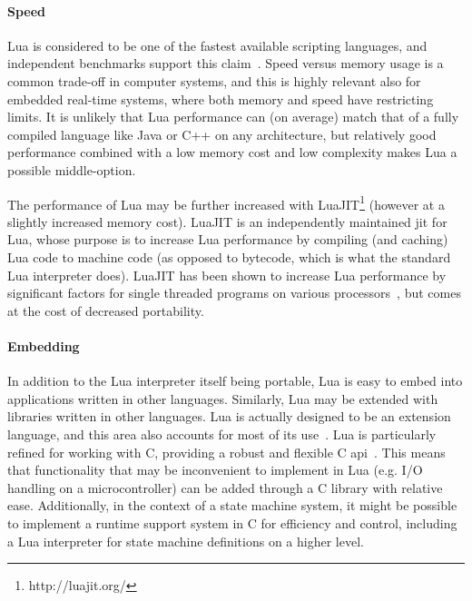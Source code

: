 \paragraph{Speed}
Lua is considered to be one of the fastest available scripting languages, and independent benchmarks support this claim~\cite{website:computer_language_benchmarks_game}. Speed versus memory usage is a common trade-off in computer systems, and this is highly relevant also for embedded real-time systems, where both memory and speed have restricting limits. It is unlikely that Lua performance can (on average) match that of a fully compiled language like Java or C++ on any architecture, but relatively good performance combined with a low memory cost and low complexity makes Lua a possible middle-option.

The performance of Lua may be further increased with LuaJIT\footnote{http://luajit.org/} (however at a slightly increased memory cost). LuaJIT is an independently maintained \gls{jit} for Lua, whose purpose is to increase Lua performance by compiling (and caching) Lua code to machine code (as opposed to bytecode, which is what the standard Lua interpreter does). LuaJIT has been shown to increase Lua performance by significant factors for single threaded programs on various processors~\cite{website:luajit_performance}, but comes at the cost of decreased portability.

\paragraph{Embedding}
In addition to the Lua interpreter itself being portable, Lua is easy to embed into applications written in other languages. Similarly, Lua may be extended with libraries written in other languages. Lua is actually designed to be an extension language, and this area also accounts for most of its use~\cite{website:where_lua_is_used}. Lua is particularly refined for working with C, providing a robust and flexible C \gls{api}~\cite[Ch.24]{book:programming_in_lua_first}. This means that functionality that may be inconvenient to implement in Lua (e.g. I/O handling on a microcontroller) can be added through a C library with relative ease. Additionally, in the context of a state machine system, it might be possible to implement a runtime support system in C for efficiency and control, including a Lua interpreter for state machine definitions on a higher level.

